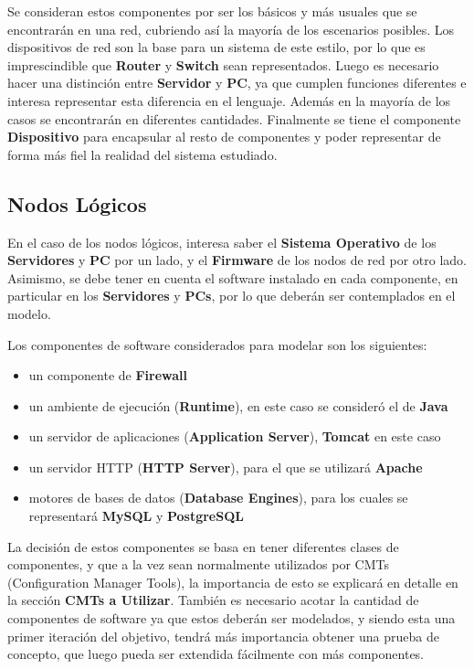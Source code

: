 Se consideran estos componentes por ser los básicos y más usuales que se encontrarán en una red, cubriendo así la mayoría de los escenarios posibles. Los dispositivos de red son la base para un sistema de este estilo, por lo que es imprescindible que \textbf{Router} y \textbf{Switch} sean representados. Luego es necesario hacer una distinción entre \textbf{Servidor} y \textbf{PC}, ya que cumplen funciones diferentes e interesa representar esta diferencia en el lenguaje. Además en la mayoría de los casos se encontrarán en diferentes cantidades.
Finalmente se tiene el componente \textbf{Dispositivo} para encapsular al resto de componentes y poder representar de forma más fiel la realidad del sistema estudiado.

\subsection{Nodos Lógicos}
En el caso de los nodos lógicos, interesa saber el \textbf{Sistema Operativo} de los \textbf{Servidores} y \textbf{PC} por un lado, y el \textbf{Firmware} de los nodos de red por otro lado. Asimismo, se debe tener en cuenta el software instalado en cada componente, en particular en los \textbf{Servidores} y \textbf{PCs}, por lo que deberán ser contemplados en el modelo. 

Los componentes de software considerados para modelar son los siguientes: 
\begin{itemize}
    \item un componente de \textbf{Firewall}
    \item un ambiente de ejecución (\textbf{Runtime}), en este caso se consideró el de \textbf{Java}
    \item un servidor de aplicaciones (\textbf{Application Server}), \textbf{Tomcat} en este caso
    \item un servidor HTTP (\textbf{HTTP Server}), para el que se utilizará \textbf{Apache}
    \item motores de bases de datos (\textbf{Database Engines}), para los cuales se representará \textbf{MySQL} y \textbf{PostgreSQL}
\end{itemize}

La decisión de estos componentes se basa en tener diferentes clases de componentes, y que a la vez sean normalmente utilizados por CMTs (Configuration Manager Tools), la importancia de esto se explicará en detalle en la sección \textbf{CMTs a Utilizar}. También es necesario acotar la cantidad de componentes de software ya que estos deberán ser modelados, y siendo esta una primer iteración del objetivo, tendrá más importancia obtener una prueba de concepto, que luego pueda ser extendida fácilmente con más componentes.

